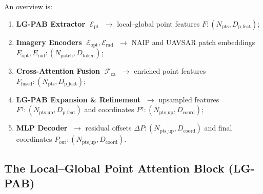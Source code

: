 \documentclass[remotesensing,article,submit,pdftex,moreauthors]{Definitions/mdpi}
\begin{document}
An overview is:

\begin{enumerate}[leftmargin=*]
\item \textbf{LG-PAB Extractor} $\;\mathcal{E}_{\mathrm{pt}}$
      $\;\rightarrow$ local–global point features $F: (N_{\text{pts}}, D_{\text{p\_feat}})$;
\item \textbf{Imagery Encoders} $\;\mathcal{E}_{\mathrm{opt}},\mathcal{E}_{\mathrm{rad}}$
      $\;\rightarrow$ NAIP and UAVSAR patch embeddings $E_{\text{opt}}, E_{\text{rad}}: (N_{\text{patch}}, D_{\text{token}})$;
\item \textbf{Cross-Attention Fusion} $\;\mathcal{F}_{\mathrm{ca}}$
      $\;\rightarrow$ enriched point features $F_{\!\mathrm{fused}}: (N_{\text{pts}}, D_{\text{p\_feat}})$;
\item \textbf{LG-PAB Expansion \& Refinement}
      $\;\rightarrow$ upsampled features $F^{\uparrow}: (N_{\text{pts\_up}}, D_{\text{p\_feat}})$ and coordinates $P^{\uparrow}: (N_{\text{pts\_up}}, D_{\text{coord}})$;
\item \textbf{MLP Decoder} $\;\rightarrow$ residual offsets $\Delta P: (N_{\text{pts\_up}}, D_{\text{coord}})$ and final coordinates $P_{\mathrm{out}}: (N_{\text{pts\_up}}, D_{\text{coord}})$.
\end{enumerate}

\subsection{The Local–Global Point Attention Block (LG-PAB)}
\label{sec:lgpab}
\end{document}
